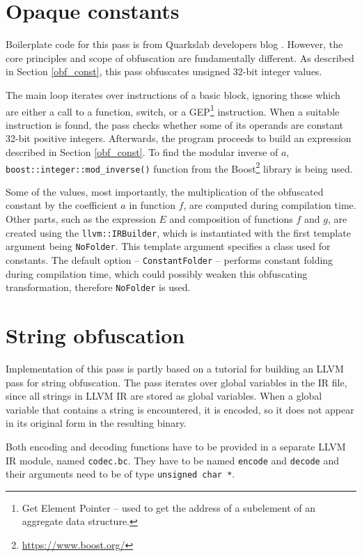 \documentclass[
  digital, %
  notable,   %
  twoside, %
  nolof,     %
  nolot,     %
]{fithesis3}
\theoremstyle{definition}
\begin{document}
\section{Opaque constants}
Boilerplate code for this pass is from Quarkslab developers blog \cite{atrocities}. However, the core principles and scope of obfuscation are fundamentally different. As described in Section \ref{obf_const}, this pass obfuscates unsigned 32-bit integer values. 

The main loop iterates over instructions of a basic block, ignoring those which are either a call to a function, switch, or a GEP\footnote{Get Element Pointer -- used to get the address of a subelement of an aggregate data structure.} instruction. When a suitable instruction is found, the pass checks whether some of its operands are constant 32-bit positive integers. Afterwards, the program proceeds to build an expression described in Section \ref{obf_const}. To find the modular inverse of $a$, \texttt{boost::integer::mod\_inverse()} function from the Boost\footnote{\url{https://www.boost.org/}} library is being used. 

Some of the values, most importantly, the multiplication of the obfuscated constant by the coefficient $a$ in function $f$, are computed during compilation time. Other parts, such as the expression $E$ and composition of functions $f$ and $g$, are created using the \texttt{llvm::IRBuilder}, which is instantiated with the first template argument being \texttt{NoFolder}. This template argument specifies a class used for constants. The default option -- \texttt{ConstantFolder} -- performs constant folding during compilation time, which could possibly weaken this obfuscating transformation, therefore \texttt{NoFolder} is used. 



\section{String obfuscation}
Implementation of this pass is partly based on a tutorial \cite{blog_strobf} for building an LLVM pass for string obfuscation. The pass iterates over global variables in the IR file, since all strings in LLVM IR are stored as global variables. When a global variable that contains a string is encountered, it is encoded, so it does not appear in its original form in the resulting binary. 

Both encoding and decoding functions have to be provided in a separate LLVM IR module, named \texttt{codec.bc}. They have to be named \texttt{encode} and \texttt{decode} and their arguments need to be of type \texttt{unsigned char *}. 
\end{document}
